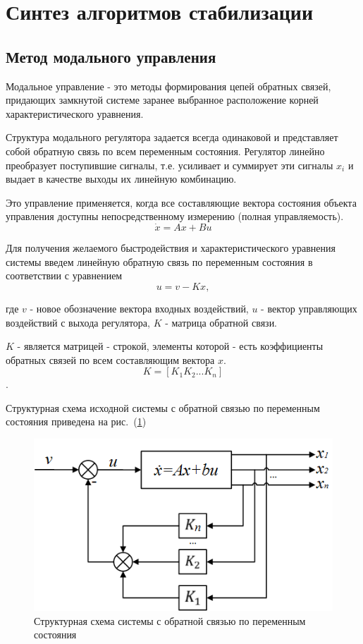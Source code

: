 \section{Синтез алгоритмов стабилизации}

\subsection{Метод модального управления}
Модальное управление - это методы формирования цепей обратных связей, придающих замкнутой системе заранее выбранное расположение корней характеристического уравнения.

Структура модального регулятора задается всегда одинаковой и представляет собой обратную связь по всем переменным состояния. Регулятор линейно преобразует поступившие сигналы, т.е. усиливает и суммирует эти сигналы $x_i$ и выдает в качестве выходы их линейную комбинацию.

Это управление применяется, когда все составляющие вектора состояния объекта управления доступны непосредственному измерению (полная управляемость). 
\begin{equation}
\Dot{x} = A x + B u
\label{eq:main_eq_modal_control}
\end{equation}

Для получения желаемого быстродействия и характеристического уравнения системы введем линейную обратную связь по переменным состояния в соответствии с уравнением
\begin{equation}
u = v - Kx,
\label{eq:eq_control}
\end{equation}

где $v$ - новое обозначение вектора входных воздействий, $u$ - вектор управляющих воздействий с выхода регулятора, $K$ - матрица обратной связи.

$K$ - является матрицей -  строкой, элементы которой - есть коэффициенты обратных связей по всем составляющим вектора $x$.
$$K = \left[ K_1 K_2 ... K_n \right]$$.

Структурная схема исходной системы с обратной связью по переменным состояния приведена на рис.~(\ref{fig:struct_scheme_feedback_variable_sost})

\begin{figure}[h]
	\centering
	\includegraphics[scale=0.6]{images/struct_scheme_feedback_variable_sost.png}
	\caption{Структурная схема системы с обратной связью по переменным состояния}
	\label{fig:struct_scheme_feedback_variable_sost}
\end{figure}



